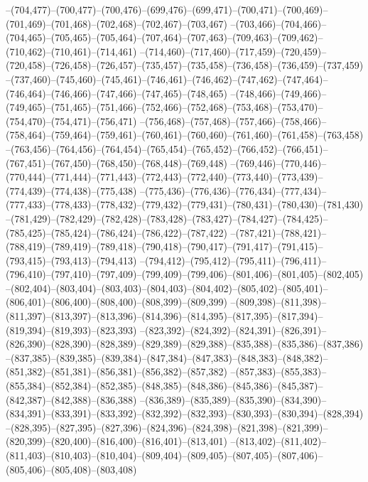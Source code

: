 --(704,477)--(700,477)--(700,476)--(699,476)--(699,471)--(700,471)--(700,469)--(701,469)--(701,468)--(702,468)--(702,467)--(703,467)
--(703,466)--(704,466)--(704,465)--(705,465)--(705,464)--(707,464)--(707,463)--(709,463)--(709,462)--(710,462)--(710,461)--(714,461)
--(714,460)--(717,460)--(717,459)--(720,459)--(720,458)--(726,458)--(726,457)--(735,457)--(735,458)--(736,458)--(736,459)--(737,459)
--(737,460)--(745,460)--(745,461)--(746,461)--(746,462)--(747,462)--(747,464)--(746,464)--(746,466)--(747,466)--(747,465)--(748,465)
--(748,466)--(749,466)--(749,465)--(751,465)--(751,466)--(752,466)--(752,468)--(753,468)--(753,470)--(754,470)--(754,471)--(756,471)
--(756,468)--(757,468)--(757,466)--(758,466)--(758,464)--(759,464)--(759,461)--(760,461)--(760,460)--(761,460)--(761,458)--(763,458)
--(763,456)--(764,456)--(764,454)--(765,454)--(765,452)--(766,452)--(766,451)--(767,451)--(767,450)--(768,450)--(768,448)--(769,448)
--(769,446)--(770,446)--(770,444)--(771,444)--(771,443)--(772,443)--(772,440)--(773,440)--(773,439)--(774,439)--(774,438)--(775,438)
--(775,436)--(776,436)--(776,434)--(777,434)--(777,433)--(778,433)--(778,432)--(779,432)--(779,431)--(780,431)--(780,430)--(781,430)
--(781,429)--(782,429)--(782,428)--(783,428)--(783,427)--(784,427)--(784,425)--(785,425)--(785,424)--(786,424)--(786,422)--(787,422)
--(787,421)--(788,421)--(788,419)--(789,419)--(789,418)--(790,418)--(790,417)--(791,417)--(791,415)--(793,415)--(793,413)--(794,413)
--(794,412)--(795,412)--(795,411)--(796,411)--(796,410)--(797,410)--(797,409)--(799,409)--(799,406)--(801,406)--(801,405)--(802,405)
--(802,404)--(803,404)--(803,403)--(804,403)--(804,402)--(805,402)--(805,401)--(806,401)--(806,400)--(808,400)--(808,399)--(809,399)
--(809,398)--(811,398)--(811,397)--(813,397)--(813,396)--(814,396)--(814,395)--(817,395)--(817,394)--(819,394)--(819,393)--(823,393)
--(823,392)--(824,392)--(824,391)--(826,391)--(826,390)--(828,390)--(828,389)--(829,389)--(829,388)--(835,388)--(835,386)--(837,386)
--(837,385)--(839,385)--(839,384)--(847,384)--(847,383)--(848,383)--(848,382)--(851,382)--(851,381)--(856,381)--(856,382)--(857,382)
--(857,383)--(855,383)--(855,384)--(852,384)--(852,385)--(848,385)--(848,386)--(845,386)--(845,387)--(842,387)--(842,388)--(836,388)
--(836,389)--(835,389)--(835,390)--(834,390)--(834,391)--(833,391)--(833,392)--(832,392)--(832,393)--(830,393)--(830,394)--(828,394)
--(828,395)--(827,395)--(827,396)--(824,396)--(824,398)--(821,398)--(821,399)--(820,399)--(820,400)--(816,400)--(816,401)--(813,401)
--(813,402)--(811,402)--(811,403)--(810,403)--(810,404)--(809,404)--(809,405)--(807,405)--(807,406)--(805,406)--(805,408)--(803,408)
